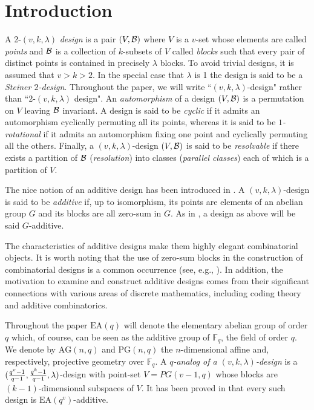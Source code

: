 \documentclass[a4paper, 11pt]{article}
\theoremstyle{definition}
\theoremstyle{definition}
\theoremstyle{definition}
\newcommand{\F}{\mathbb{F}}
\numberwithin{equation}{section}
\begin{document}
\section{Introduction}
A 2-$(v,k,\lambda)$ {\it design} is a pair $(V,{\cal B})$ where $V$ is a $v$-set whose elements are called {\it points}
and $\cal B$ is a collection of $k$-subsets of $V$ called {\it blocks} such that every pair of distinct points is contained
in precisely $\lambda$ blocks. To avoid trivial designs, it is assumed that $v>k>2$.
In the special case that $\lambda$ is 1 the design is said to be a {\it Steiner $2$-design}.
Throughout the paper, we will write ``$(v,k,\lambda)$-design" rather than ``2-$(v,k,\lambda)$ design".
An {\it automorphism} of a design $(V,{\cal B})$ is a permutation on $V$ leaving $\cal B$ invariant.
A design is said to be {\it cyclic} if it admits an automorphism cyclically permuting all its points, whereas it
is said to be {\it $1$-rotational} if it admits an automorphism fixing one point and cyclically permuting all the others.
Finally, a $(v,k,\lambda)$-design $(V,{\cal B})$ is said to be {\it resolvable} if there exists a partition 
of $\cal B$ ({\it resolution}) into classes ({\it parallel classes}) each of which is a partition of $V$.

The nice notion of an additive design has been introduced in \cite{CFP}.
A $(v,k,\lambda)$-design is said to be {\it additive} if, up to isomorphism, its
points are elements of an abelian group $G$ and its blocks are all zero-sum in $G$.
As in \cite{BN1}, a design as above will be said $G$-additive.

The characteristics of additive designs make them highly elegant combinatorial objects. It is worth noting that the 
use of zero-sum blocks in the construction of combinatorial designs is a common occurrence 
(see, e.g., \cite{BCHW, BH, BP, C, EW, K, PD, WW}). In addition, the motivation to examine and construct additive designs comes from their significant connections with various areas of discrete mathematics, including coding theory and additive combinatorics.


Throughout the paper $\mathrm{EA}(q)$ will denote the elementary abelian group of order $q$
which, of course, can be seen as the additive group of $\F_q$, the field of order $q$.
We denote by $\mathrm{AG}(n,q)$ and $\mathrm{PG}(n,q)$ the $n$-dimensional affine and, respectively, projective geometry 
over $\F_q$.
A {\it $q$-analog of a $(v,k,\lambda)$-design}
is a $({q^v-1\over q-1},{q^k-1\over q-1},\lambda)$-design
with point-set $V=PG(v-1,q)$ whose blocks are $(k-1)$-dimensional subspaces of $V$.
It has been proved in \cite{BN2} that every such design is $\mathrm{EA}(q^v)$-additive.
\end{document}
